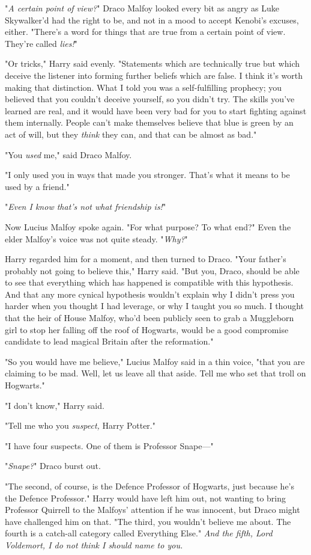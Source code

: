 "\emph{A certain point of view?}" Draco Malfoy looked every bit as angry as
Luke Skywalker'd had the right to be, and not in a mood to accept Kenobi's
excuses, either. "There's a word for things that are true from a certain point
of view. They're called \emph{lies!}"

"Or tricks," Harry said evenly. "Statements which are technically true but
which deceive the listener into forming further beliefs which are false. I
think it's worth making that distinction. What I told you was a self-fulfilling
prophecy; you believed that you couldn't deceive yourself, so you didn't try.
The skills you've learned are real, and it would have been very bad for you to
start fighting against them internally. People can't make themselves believe
that blue is green by an act of will, but they \emph{think} they can, and that
can be almost as bad."

"You \emph{used} me," said Draco Malfoy.

"I only used you in ways that made you stronger. That's what it means to be
used by a friend."

"\emph{Even I know that's not what friendship is!}"

Now Lucius Malfoy spoke again. "For what purpose? To what end?" Even the elder
Malfoy's voice was not quite steady. "\emph{Why?}"

Harry regarded him for a moment, and then turned to Draco. "Your father's
probably not going to believe this," Harry said. "But you, Draco, should be
able to see that everything which has happened is compatible with this
hypothesis. And that any more cynical hypothesis wouldn't explain why I didn't
press you harder when you thought I had leverage, or why I taught you so much.
I thought that the heir of House Malfoy, who'd been publicly seen to grab a
Muggleborn girl to stop her falling off the roof of Hogwarts, would be a good
compromise candidate to lead magical Britain after the reformation."

"So you would have me believe," Lucius Malfoy said in a thin voice, "that you
are claiming to be mad. Well, let us leave all that aside. Tell me who set that
troll on Hogwarts."

"I don't know," Harry said.

"Tell me who you \emph{suspect,} Harry Potter."

"I have four suspects. One of them is Professor Snape---"

"\emph{Snape?}" Draco burst out.

"The second, of course, is the Defence Professor of Hogwarts, just because he's
the Defence Professor." Harry would have left him out, not wanting to bring
Professor Quirrell to the Malfoys' attention if he was innocent, but Draco
might have challenged him on that. "The third, you wouldn't believe me about. The
fourth is a catch-all category called Everything Else." \emph{And the fifth,
Lord Voldemort, I do not think I should name to you.}

